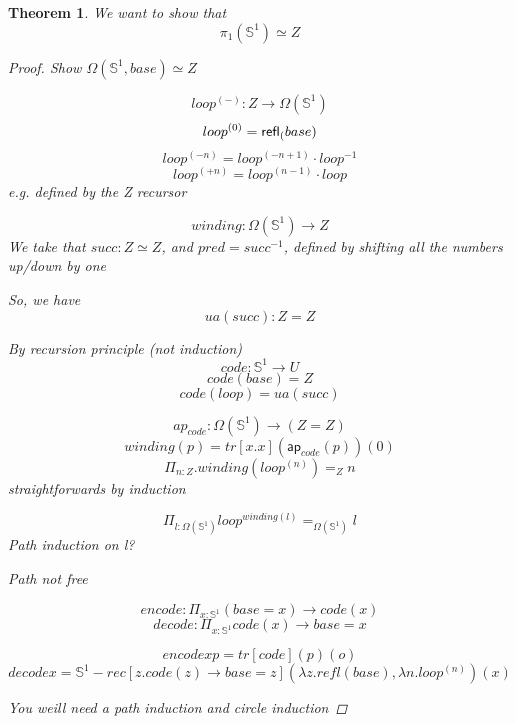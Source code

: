 \documentclass[11pt]{article}
\renewcommand{\SS}{\mathbb{S}}
\newcommand*{\ap}{\mathsf{ap}}
\newtheorem{thm}{Theorem}
\begin{document}
\begin{thm}
We want to show that
$$\pi_1(\SS^1) \simeq Z$$
\begin{proof}
Show $\Omega(\SS^1, base) \simeq Z$

$$loop^{(-)} : Z \rightarrow \Omega(\SS^1)$$
$$loop^{(0)} = \mathsf{refl}_{(} base)$$
$$loop^{(-n)} = loop^{(-n + 1)} \cdot loop^{-1}$$
$$loop^{(+n)} = loop^{(n - 1)} \cdot loop$$
e.g. defined by the Z recursor

$$winding : \Omega(\SS^{1}) \rightarrow Z$$
We take that $succ : Z \simeq Z$, and $pred = succ^{-1}$, defined by shifting all the numbers up/down by one

So, we have
$$ua(succ) : Z = Z$$

By recursion principle (not induction)
$$code : \SS^1 \rightarrow U$$
$$code(base) = Z$$
$$code(loop) = ua(succ)$$

$$ap_{code} : \Omega(\SS^1) \rightarrow (Z = Z)$$
$$winding(p) = tr[x.x](\ap_{code}(p))(0)$$
$$\Pi_{n : Z} . winding(loop^{(n)}) =_Z n$$
straightforwards by induction

$$\Pi_{l : \Omega(\SS^1)} loop^{winding(l)} =_{\Omega(\SS^1)} l$$
Path induction on l?

Path not free

$$encode : \Pi_{x : \SS^1} (base = x) \rightarrow code(x)$$
$$decode : \Pi_{x : \SS^1} code(x) \rightarrow base = x$$

$$encode x p = tr[code](p)(o)$$
$$decode x = \SS^1-rec[z.code(z) \rightarrow base = z](\lambda z . refl(base), \lambda n . loop^{(n)})(x)$$


You weill need a path induction and circle induction
\end{proof}
\end{thm}
\end{document}
